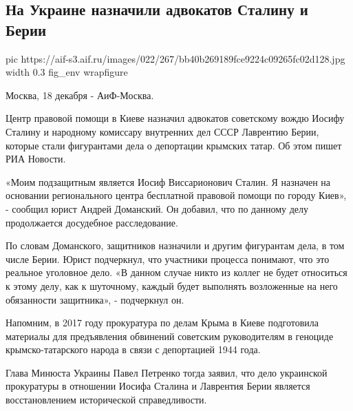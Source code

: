  
 
 
 
 
 
\subsection{На Украине назначили адвокатов Сталину и Берии}
\label{sec:18_12_2020.news.ru.aif.1.stalin_beria_advokaty}

\ifcmt
  pic https://aif-s3.aif.ru/images/022/267/bb40b269189fce9224c09265fc02d128.jpg
  width 0.3
  fig_env wrapfigure
\fi

Москва, 18 декабря - АиФ-Москва.

Центр правовой помощи в Киеве назначил адвокатов советскому вождю Иосифу
Сталину и народному комиссару внутренних дел СССР Лаврентию Берии, которые
стали фигурантами дела о депортации крымских татар. Об этом пишет РИА Новости.

«Моим подзащитным является Иосиф Виссарионович Сталин. Я назначен на основании
регионального центра бесплатной правовой помощи по городу Киев», - сообщил
юрист Андрей Доманский. Он добавил, что по данному делу продолжается досудебное
расследование.

По словам Доманского, защитников назначили и другим фигурантам дела, в том
числе Берии. Юрист подчеркнул, что участники процесса понимают, что это
реальное уголовное дело. «В данном случае никто из коллег не будет относиться к
этому делу, как к шуточному, каждый будет выполнять возложенные на него
обязанности защитника», - подчеркнул он.  

Напомним, в 2017 году прокуратура по делам Крыма в Киеве подготовила материалы
для предъявления обвинений советским руководителям в геноциде
крымско-татарского народа в связи с депортацией 1944 года.

Глава Минюста Украины Павел Петренко тогда заявил, что дело украинской
прокуратуры в отношении Иосифа Сталина и Лаврентия Берии является
восстановлением исторической справедливости.

